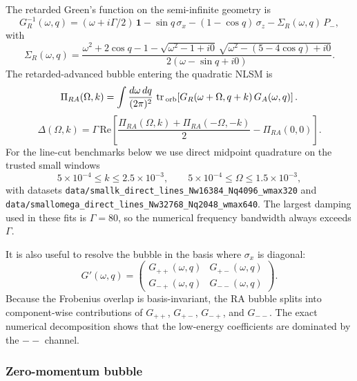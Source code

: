 \documentclass[aps,prx,preprint,amsmath,amssymb]{revtex4-2}
\newcommand{\tr}{{\rm \, tr\,}}
\renewcommand{\Re}{\text{Re}}
\begin{document}
The retarded Green's function on the semi-infinite geometry is
\begin{equation}
G_R^{-1}(\omega,q)
=
(\omega+i\Gamma/2)\,\mathbf{1}
-\sin q\,\sigma_x
-(1-\cos q)\,\sigma_z
-\Sigma_R(\omega,q)\,P_-,
\end{equation}
with
\begin{equation}
\Sigma_R(\omega,q)
=
\frac{
\omega^2+2\cos q-1
-\sqrt{\omega^2-1+i0}\,\sqrt{\omega^2-(5-4\cos q)+i0}
}{
2(\omega-\sin q+i0)
}.
\end{equation}
The retarded-advanced bubble entering the quadratic NLSM is
\begin{equation}
\Pi_{RA}(\Omega,k)
=
\int\frac{d\omega\,dq}{(2\pi)^2}\,
\tr_{\rm orb}\!\left[
G_R(\omega+\Omega,q+k)\,G_A(\omega,q)
\right].
\end{equation}
\begin{equation}\label{eq:Delta-appendix-main}
\Delta(\Omega,k)
=
\Gamma\,\Re\!\left[
\frac{\Pi_{RA}(\Omega,k)+\Pi_{RA}(-\Omega,-k)}{2}-\Pi_{RA}(0,0)
\right].
\end{equation}
For the line-cut benchmarks below we use direct midpoint quadrature on the
trusted small windows
\[
5\times10^{-4}\le k\le 2.5\times10^{-3},
\qquad
5\times10^{-4}\le \Omega\le 1.5\times10^{-3},
\]
with datasets
\texttt{data/smallk\_direct\_lines\_Nw16384\_Nq4096\_wmax320} and
\texttt{data/smallomega\_direct\_lines\_Nw32768\_Nq2048\_wmax640}.  The largest
damping used in these fits is \(\Gamma=80\), so the numerical frequency
bandwidth always exceeds \(\Gamma\).

It is also useful to resolve the bubble in the basis where \(\sigma_x\) is
diagonal:
\begin{equation}
G'(\omega,q)=
\begin{pmatrix}
G_{++}(\omega,q) & G_{+-}(\omega,q)\\
G_{-+}(\omega,q) & G_{--}(\omega,q)
\end{pmatrix}.
\end{equation}
Because the Frobenius overlap is basis-invariant, the RA bubble splits into
component-wise contributions of \(G_{++}\), \(G_{+-}\), \(G_{-+}\), and
\(G_{--}\).  The exact numerical decomposition shows that the low-energy
coefficients are dominated by the \(--\) channel.

\subsubsection{Zero-momentum bubble}
\end{document}
